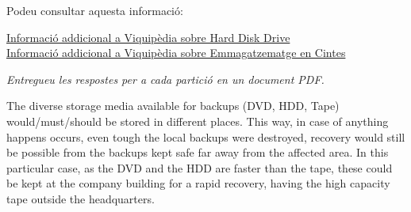 \documentclass[10pt,a4paper]{article}
\begin{document}
	Podeu consultar aquesta informació:
	
	\href{http://en.wikipedia.org/wiki/Hard_disk_drive}{Informació addicional a Viquipèdia sobre Hard Disk Drive}\\
	\href{http://en.wikipedia.org/wiki/Tape_drive}{Informació addicional a Viquipèdia sobre Emmagatzematge en Cintes}\\
	\begin{center}
				{\footnotesize \textit{Entregueu les respostes per a cada partició en un document PDF.}}
	\end{center}

	\newpage
	\color{black}
	The  diverse storage media available for backups (DVD, HDD, Tape) would/must/should be stored in different places. This way, in case of anything happens occurs, even tough the local backups were destroyed, recovery would still be possible from the backups kept safe far away from the affected area. In this particular case, as the DVD and the HDD are faster than the tape, these could be kept at the company building for a rapid recovery, having the high capacity tape outside the headquarters.
	
\end{document}
